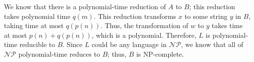 \documentclass[]{article}
\begin{document}
\begin{enumerate}
\begin{enumerate}
We know that there is a polynomial-time reduction of $A$ to $B$; this reduction
takes polynomial time $q(m)$. This reduction transforms $x$ to some string $y$
in $B$, taking time at most $q(p(n))$. Thus, the transformation of $w$ to $y$
takes time at most $p(n) + q(p(n))$, which is a polynomial. Therefore, $L$ is
polynomial-time reducible to $B$. Since $L$ could be any language in
$\mathcal{NP}$, we know that all of $\mathcal{NP}$ polynomial-time reduces to
$B$; thus, $B$ is NP-complete.

\end{enumerate}
\end{enumerate}
\end{document}
